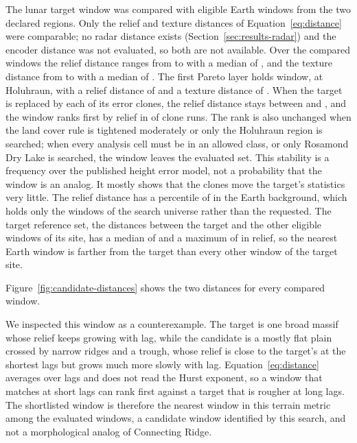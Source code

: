 The lunar target window was compared with \ComparedCount{} eligible Earth windows from the two
declared regions. Only the relief and texture distances of Equation~\eqref{eq:distance} were
comparable; no radar distance exists (Section~\ref{sec:results-radar}) and the encoder distance was
not evaluated, so both are not available. Over the compared windows the relief distance ranges from \ReliefDistanceMin{} to
\ReliefDistanceMax{} with a median of \ReliefDistanceMedian, and the texture distance from
\TextureDistanceMin{} to \TextureDistanceMax{} with a median of \TextureDistanceMedian. The first
Pareto layer holds \ShortlistCount{} window, \texttt{\ShortlistWindow} at Holuhraun, with a relief
distance of \BestReliefDistance{} and a texture distance of \BestTextureDistance. When the target
is replaced by each of its \BestCloneN{} error clones, the relief distance stays between
\BestCloneReliefMin{} and \BestCloneReliefMax, and the window ranks first by relief in
\BestRankFirstCount{} of \BestRankFirstN{} clone runs. The rank is also unchanged when the land
cover rule is tightened moderately or only the Holuhraun region is searched; when every analysis
cell must be in an allowed class, or only Rosamond Dry Lake is searched, the window leaves the
evaluated set. This stability is a frequency over the published height error model, not a
probability that the window is an analog. It mostly shows that the clones move the target's
statistics very little. The relief distance has a percentile of \BestBackgroundPercentile{} in the Earth background, which holds only the \MoonBackgroundN{} windows of the search universe rather than the \MoonBackgroundRequested{} requested. The target reference set, the distances between the target and the other \BestReferenceSpreadN{} eligible windows of its site, has a median of \MoonRefReliefMedian{} and a maximum of \MoonRefReliefMax{} in relief, so the nearest Earth window is farther from the target than every other window of the target site.

Figure~\ref{fig:candidate-distances} shows the two distances for every compared window.



We inspected this window as a counterexample. The target is one broad massif whose relief keeps growing with
lag, while the candidate is a mostly flat plain crossed by narrow ridges and a trough, whose
relief is close to the target's at the shortest lags but grows much more slowly with lag. Equation~\eqref{eq:distance} averages over lags and does not read the Hurst exponent, so a
window that matches at short lags can rank first against a target that is rougher at long lags.
The shortlisted window is therefore the nearest window in this terrain metric among the evaluated
windows, a candidate window identified by this search, and not a morphological analog of
Connecting Ridge.

